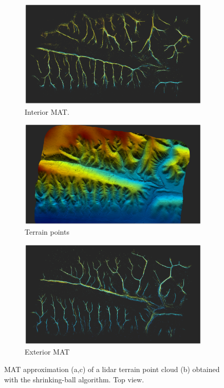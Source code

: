 \begin{figure}
	\centering
	\begin{subfigure}{0.310\linewidth}
		\includegraphics[angle=90,width=\linewidth]{figs/iMAT.png}
		\caption{Interior MAT.}
		\label{fig:ca_ridge:imat}
	\end{subfigure}
	\quad
	\begin{subfigure}{0.310\linewidth}
		\includegraphics[angle=90,width=\linewidth]{figs/terrain.png}
		\caption{Terrain points}
		\label{fig:ca_ridge:terrain}
	\end{subfigure}
	\quad
	\begin{subfigure}{0.310\linewidth}
		\includegraphics[angle=90,width=\linewidth]{figs/oMAT.png}
		\caption{Exterior MAT}
		\label{fig:ca_ridge:omat}
	\end{subfigure}
	\caption{MAT approximation (a,c) of a lidar terrain point cloud (b) obtained with the shrinking-ball algorithm. Top view.}
	\label{fig:ca_ridge}
\end{figure}

